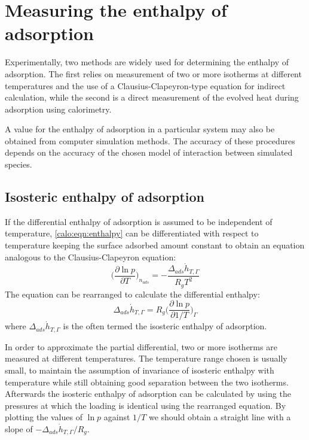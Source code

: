 
\section{Measuring the enthalpy of adsorption}

Experimentally, two methods are widely used for determining the
enthalpy of adsorption. The first relies on measurement of two
or more isotherms at different temperatures and the use of
a Clausius-Clapeyron-type equation for indirect calculation,
while the second is a direct measurement of the evolved heat
during adsorption using calorimetry.

A value for the enthalpy of adsorption in a particular system
may also be obtained from computer simulation methods.
The accuracy of these procedures depends on the accuracy of
the chosen model of interaction between simulated species.

\subsection{Isosteric enthalpy of adsorption}

If the differential enthalpy of adsorption is assumed to be independent
of temperature, \autoref{calo:eqn:enthalpy} can be differentiated
with respect to temperature keeping the surface adsorbed amount constant
to obtain an equation analogous to the Clausius-Clapeyron equation:
%
\begin{equation}
	\Big( \frac{\partial \ln p}{\partial T} \Big)_{n_{ads}} = -\frac{\Delta_{ads}\dot{h}_{T, \Gamma}}{R_g T^2}
\end{equation}
%
The equation can be rearranged to calculate the differential enthalpy:
%
\begin{equation}\label{calo:eqn:claus-clap}
	\Delta_{ads}\dot{h}_{T, \Gamma} = R_g \Big( \frac{\partial \ln p}{\partial 1 / T} \Big)_{\Gamma}
\end{equation}
%
where \(\Delta_{ads}\dot{h}_{T, \Gamma}\) is the often termed the
isosteric enthalpy of adsorption.

In order to approximate the partial differential, two or more
isotherms are measured at different temperatures. The temperature
range chosen is usually small, to maintain the assumption of invariance
of isosteric enthalpy with temperature while still obtaining good 
separation between the two isotherms.
Afterwards the isosteric enthalpy of adsorption can be calculated
by using the pressures at which the loading is identical using the
rearranged equation. By plotting the values of \(\ln p\) against
\(1 / T\) we should obtain a straight line with a slope
of \(- \Delta_{ads}\dot{h}_{T, \Gamma} / R_g\).

